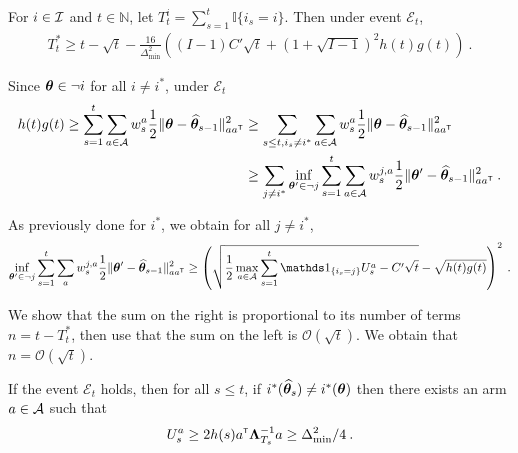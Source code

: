 \begin{theorem}
For $i\in\mathcal{I}$ and $t\in \mathbb{N}$, let $T_t^i = \sum_{s=1}^t \mathbb{I}\{i_s=i\}$. Then under event $\mathcal E_t$,
\begin{align*}
T_t^*
\ge t - \sqrt{t} - \frac{16}{\Delta_{\min}^2}\left((I-1)C'\sqrt{t} + (1 + \sqrt{I-1})^2 h(t)g(t)\right)
\: .
\end{align*}
\end{theorem}

Since ${\boldsymbol \theta} \in \neg i$ for all $i\neq i^*$, under $\mathcal E_t$%
\begin{align*}
h(t)g(t)
\ge \sum_{s=1}^t \sum_{a\in \mathcal A} w_s^a \frac{1}{2}\Vert {\boldsymbol \theta} - \widehat{{\boldsymbol \theta}}_{s-1} \Vert_{aa^{\mathsf{\scriptscriptstyle T}}}^2
&\ge \sum_{s\le t, i_s\neq i^*} \sum_{a \in \mathcal A} w_s^a \frac{1}{2}\Vert {\boldsymbol \theta} - \widehat{{\boldsymbol \theta}}_{s-1} \Vert_{aa^{\mathsf{\scriptscriptstyle T}}}^2
\\
&\ge \sum_{j \neq i^*} \inf_{{\boldsymbol \theta}'\in \neg j} \sum_{s = 1}^t \sum_{a \in \mathcal A} w_s^{j,a} \frac{1}{2}\Vert {\boldsymbol \theta}' - \widehat{{\boldsymbol \theta}}_{s-1} \Vert_{aa^{\mathsf{\scriptscriptstyle T}}}^2
\: .
\end{align*}

As previously done for $i^*$, we obtain for all $j\neq i^*$,
\begin{align*}
\inf_{\btheta'\in \neg j} \sum_{s = 1}^t \sum_a w_s^{j,a} \frac{1}{2}\Vert \btheta' - \hat{\btheta}_{s-1} \Vert_{aa^\top}^2
\ge  \left(\sqrt{\frac{1}{2}\max_{a\in\cA} \sum_{s=1}^t \ind_{\{i_s=j\}} U_s^a - C'\sqrt{t}} - \sqrt{h(t)g(t)}\right)^2
\: .
\end{align*}

We show that the sum on the right is proportional to its number of terms $n = t - T_t^*$, then use that the sum on the left is $\mathcal O(\sqrt{t})$. We obtain that $n = \mathcal O(\sqrt{t})$.

\begin{lemma}
If the event $\mathcal E_t$ holds, then for all $s\le t$, if $i^*(\widehat{{\boldsymbol \theta}}_s) \neq i^*({\boldsymbol \theta})$ then there exists an arm $a\in\mathcal{A}$ such that
\begin{align*}
U_s^a \ge 2 h(s) a^{\mathsf{\scriptscriptstyle T}} {\boldsymbol \Lambda}_{T_s}^{-1}a \ge \Delta_{\min}^2/4 \: .
\end{align*}
\end{lemma}

